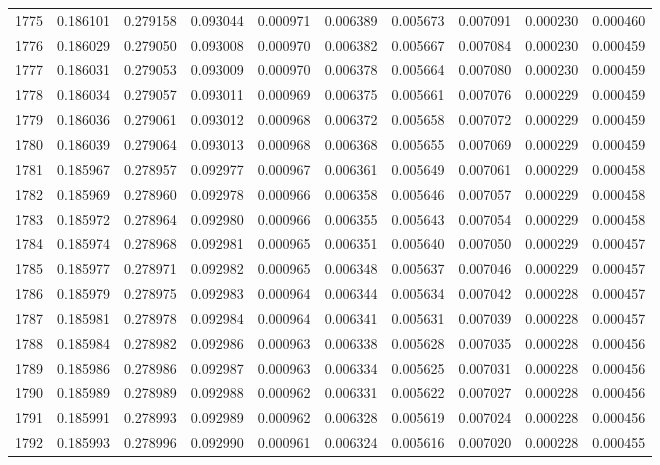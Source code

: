 \begin{tabular}{lrrrrrrrrr}
1775 & 0.186101 & 0.279158 & 0.093044 & 0.000971 & 0.006389 & 0.005673 & 0.007091 & 0.000230 & 0.000460 \\
1776 & 0.186029 & 0.279050 & 0.093008 & 0.000970 & 0.006382 & 0.005667 & 0.007084 & 0.000230 & 0.000459 \\
1777 & 0.186031 & 0.279053 & 0.093009 & 0.000970 & 0.006378 & 0.005664 & 0.007080 & 0.000230 & 0.000459 \\
1778 & 0.186034 & 0.279057 & 0.093011 & 0.000969 & 0.006375 & 0.005661 & 0.007076 & 0.000229 & 0.000459 \\
1779 & 0.186036 & 0.279061 & 0.093012 & 0.000968 & 0.006372 & 0.005658 & 0.007072 & 0.000229 & 0.000459 \\
1780 & 0.186039 & 0.279064 & 0.093013 & 0.000968 & 0.006368 & 0.005655 & 0.007069 & 0.000229 & 0.000459 \\
1781 & 0.185967 & 0.278957 & 0.092977 & 0.000967 & 0.006361 & 0.005649 & 0.007061 & 0.000229 & 0.000458 \\
1782 & 0.185969 & 0.278960 & 0.092978 & 0.000966 & 0.006358 & 0.005646 & 0.007057 & 0.000229 & 0.000458 \\
1783 & 0.185972 & 0.278964 & 0.092980 & 0.000966 & 0.006355 & 0.005643 & 0.007054 & 0.000229 & 0.000458 \\
1784 & 0.185974 & 0.278968 & 0.092981 & 0.000965 & 0.006351 & 0.005640 & 0.007050 & 0.000229 & 0.000457 \\
1785 & 0.185977 & 0.278971 & 0.092982 & 0.000965 & 0.006348 & 0.005637 & 0.007046 & 0.000229 & 0.000457 \\
1786 & 0.185979 & 0.278975 & 0.092983 & 0.000964 & 0.006344 & 0.005634 & 0.007042 & 0.000228 & 0.000457 \\
1787 & 0.185981 & 0.278978 & 0.092984 & 0.000964 & 0.006341 & 0.005631 & 0.007039 & 0.000228 & 0.000457 \\
1788 & 0.185984 & 0.278982 & 0.092986 & 0.000963 & 0.006338 & 0.005628 & 0.007035 & 0.000228 & 0.000456 \\
1789 & 0.185986 & 0.278986 & 0.092987 & 0.000963 & 0.006334 & 0.005625 & 0.007031 & 0.000228 & 0.000456 \\
1790 & 0.185989 & 0.278989 & 0.092988 & 0.000962 & 0.006331 & 0.005622 & 0.007027 & 0.000228 & 0.000456 \\
1791 & 0.185991 & 0.278993 & 0.092989 & 0.000962 & 0.006328 & 0.005619 & 0.007024 & 0.000228 & 0.000456 \\
1792 & 0.185993 & 0.278996 & 0.092990 & 0.000961 & 0.006324 & 0.005616 & 0.007020 & 0.000228 & 0.000455 \\

\end{tabular}
